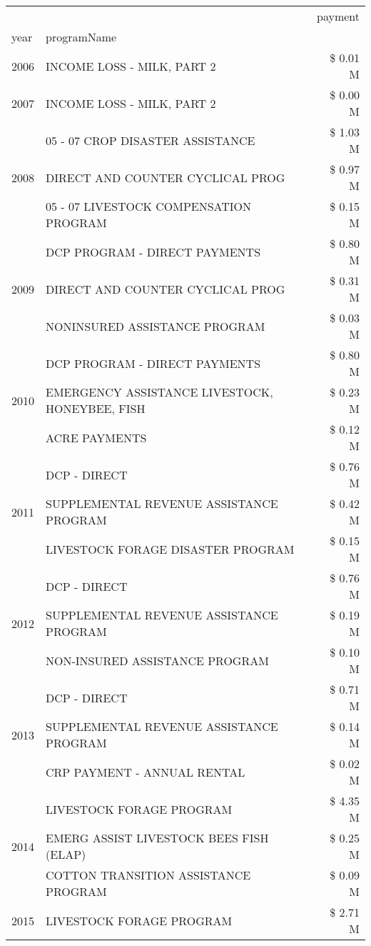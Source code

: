 \begin{tabular}{llr}
\toprule
 &  & payment \\
year & programName &  \\
\midrule
2006 & INCOME LOSS - MILK, PART 2 & \$ 0.01 M \\
\cline{1-3}
2007 & INCOME LOSS - MILK, PART 2 & \$ 0.00 M \\
\cline{1-3}
\multirow[t]{3}{*}{2008} & 05 - 07 CROP DISASTER ASSISTANCE & \$ 1.03 M \\
 & DIRECT AND COUNTER CYCLICAL PROG & \$ 0.97 M \\
 & 05 - 07 LIVESTOCK COMPENSATION PROGRAM & \$ 0.15 M \\
\cline{1-3}
\multirow[t]{3}{*}{2009} & DCP PROGRAM - DIRECT PAYMENTS & \$ 0.80 M \\
 & DIRECT AND COUNTER CYCLICAL PROG & \$ 0.31 M \\
 & NONINSURED ASSISTANCE PROGRAM & \$ 0.03 M \\
\cline{1-3}
\multirow[t]{3}{*}{2010} & DCP PROGRAM - DIRECT PAYMENTS & \$ 0.80 M \\
 & EMERGENCY ASSISTANCE LIVESTOCK, HONEYBEE, FISH & \$ 0.23 M \\
 & ACRE PAYMENTS & \$ 0.12 M \\
\cline{1-3}
\multirow[t]{3}{*}{2011} & DCP - DIRECT & \$ 0.76 M \\
 & SUPPLEMENTAL REVENUE ASSISTANCE PROGRAM & \$ 0.42 M \\
 & LIVESTOCK FORAGE DISASTER PROGRAM & \$ 0.15 M \\
\cline{1-3}
\multirow[t]{3}{*}{2012} & DCP - DIRECT & \$ 0.76 M \\
 & SUPPLEMENTAL REVENUE ASSISTANCE PROGRAM & \$ 0.19 M \\
 & NON-INSURED ASSISTANCE PROGRAM & \$ 0.10 M \\
\cline{1-3}
\multirow[t]{3}{*}{2013} & DCP - DIRECT & \$ 0.71 M \\
 & SUPPLEMENTAL REVENUE ASSISTANCE PROGRAM & \$ 0.14 M \\
 & CRP PAYMENT - ANNUAL RENTAL & \$ 0.02 M \\
\cline{1-3}
\multirow[t]{3}{*}{2014} & LIVESTOCK FORAGE PROGRAM & \$ 4.35 M \\
 & EMERG ASSIST LIVESTOCK BEES FISH (ELAP) & \$ 0.25 M \\
 & COTTON TRANSITION ASSISTANCE PROGRAM & \$ 0.09 M \\
\cline{1-3}
\multirow[t]{3}{*}{2015} & LIVESTOCK FORAGE PROGRAM & \$ 2.71 M \\

\end{tabular}
